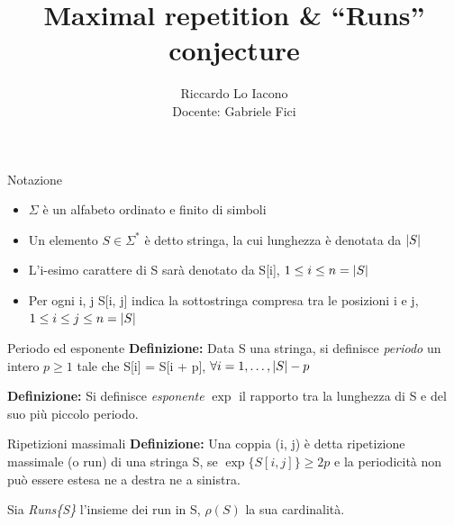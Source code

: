 \documentclass{beamer}
\title{Maximal repetition \& ``Runs'' conjecture}
\author{Riccardo Lo Iacono \\ \footnotesize{Docente: Gabriele Fici}}
\begin{document}
    \begin{frame}
        \maketitle
    \end{frame}

    \begin{frame}{Notazione}
        \begin{itemize}
            \item \(\Sigma\) è un alfabeto ordinato e finito di simboli
            \item Un elemento \(S \in \Sigma^{*}\) è detto stringa,
                la cui lunghezza è denotata da \(\left\lvert S \right\rvert\)
            \item L'i-esimo carattere di S sarà denotato da S[i],
                \(1 \le i \le n = \left\lvert S \right\rvert\)
            \item Per ogni i, j S[i, j] indica la sottostringa compresa tra le 
                posizioni i e j, \(1 \le i \le j \le n = \left\lvert S \right\rvert\)
        \end{itemize}
    \end{frame}

    \begin{frame}{Periodo ed esponente}
        \textbf{Definizione: } Data S una stringa,
        si definisce \emph{periodo} un intero \(p \ge 1\)
        tale che S[i] = S[i + p], \(\forall i = 1, \ldots, \left\lvert S \right\rvert - p\)

        \textbf{Definizione: } Si definisce \emph{esponente} \(\exp\)
        il rapporto tra la lunghezza di S e del suo più piccolo periodo.
    \end{frame}

    \begin{frame}{Ripetizioni massimali}
        \textbf{Definizione: } Una coppia (i, j) è detta ripetizione massimale
        (o run) di una stringa S, se \(\exp\{S[i, j]\} \ge 2p\) e la periodicità
        non può essere estesa ne a destra ne a sinistra.

        Sia \emph{Runs\{S\}} l'insieme dei run in S, 
        \(\rho(S)\) la sua cardinalità.
    \end{frame}
\end{document}
